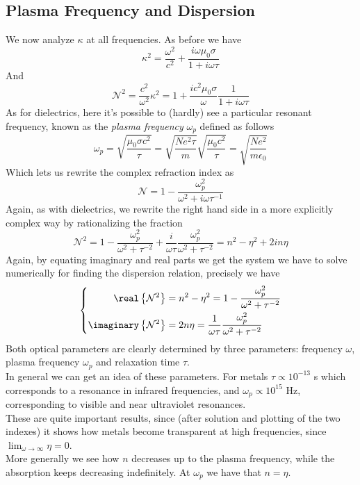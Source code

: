 \documentclass[../electromagnetism.tex]{subfiles}
\begin{document}
\subsection{Plasma Frequency and Dispersion}
We now analyze $\kappa$ at all frequencies. As before we have
\begin{equation*}
	\kappa^2=\frac{\omega^2}{c^2}+\frac{i\omega\mu_0\sigma}{1+i\omega\tau}
\end{equation*}
And 
\begin{equation*}
	\mathcal{N}^2=\frac{c^2}{\omega^2}\kappa^2=1+\frac{ic^2\mu_0\sigma}{\omega}\frac{1}{1+i\omega\tau}
\end{equation*}
As for dielectrics, here it's possible to (hardly) see a particular resonant frequency, known as the \textit{plasma frequency} $\omega_p$ defined as follows
\begin{equation}
	\omega_p=\sqrt{\frac{\mu_0\sigma c^2}{\tau}}=\sqrt{\frac{Ne^2\tau}{m}}\sqrt{\frac{\mu_0c^2}{\tau}}=\sqrt{\frac{Ne^2}{m\epsilon_0}}
	\label{eq:plasmafreq.csol}
\end{equation}
Which lets us rewrite the complex refraction index as
\begin{equation*}
	\mathcal{N}=1-\frac{\omega_p^2}{\omega^2+i\omega\tau^{-1}}
\end{equation*}
Again, as with dielectrics, we rewrite the right hand side in a more explicitly complex way by rationalizing the fraction
\begin{equation}
	\mathcal{N}^2=1-\frac{\omega_p^2}{\omega^2+\tau^{-2}}+\frac{i}{\omega\tau}\frac{\omega_p^2}{\omega^2+\tau^{-2}}=n^2-\eta^2+2in\eta
	\label{eq:rationalizedn.csol}
\end{equation}
Again, by equating imaginary and real parts we get the system we have to solve numerically for finding the dispersion relation, precisely we have
\begin{equation}
	\left\{ \begin{aligned}
			\real\left\{ \mathcal{N}^2 \right\}&=n^2-\eta^2=1-\frac{\omega_p^2}{\omega^2+\tau^{-2}}\\
			\imaginary\left\{ \mathcal{N}^2 \right\}&= 2n\eta=\frac{1}{\omega\tau}\frac{\omega_p^2}{\omega^2+\tau^{-2}}
	\end{aligned}\right.
	\label{eq:dispersionsystem.csol}
\end{equation}
Both optical parameters are clearly determined by three parameters: frequency $\omega$, plasma frequency $\omega_p$ and relaxation time $\tau$.\\
In general we can get an idea of these parameters. For metals $\tau\propto10^{-13}$ s which corresponds to a resonance in infrared frequencies, and $\omega_p\propto10^{15}$ Hz, corresponding to visible and near ultraviolet resonances.\\
These are quite important results, since (after solution and plotting of the two indexes) it shows how metals become transparent at high frequencies, since $\lim_{\omega\to\infty}\eta=0$.\\
More generally we see how $n$ decreases up to the plasma frequency, while the absorption keeps decreasing indefinitely. At $\omega_p$ we have that $n=\eta$.
\end{document}
